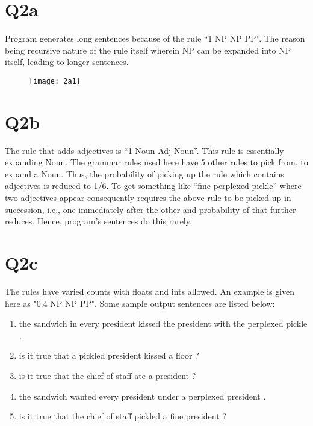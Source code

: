 \documentclass[12pt]{article}
\begin{document}
\section*{Q2a}
Program generates long sentences because of the rule “1\hspace{1cm} NP\hspace{1cm} NP PP”. The reason being recursive nature of the rule itself wherein NP can be expanded into NP itself, leading to longer sentences.
\begin{figure}[h]
\texttt{[image: 2a1]}
\centering
\end{figure}
\pagebreak
\section*{Q2b}
The rule that adds adjectives is “1\hspace{1cm} Noun\hspace{1cm} Adj Noun”.  This rule is essentially expanding Noun. The grammar rules used here have 5 other rules to pick from, to expand a Noun. Thus, the probability of picking up the rule which contains adjectives is reduced to 1/6. To get something like “fine perplexed pickle” where two adjectives appear consequently requires the above rule to be picked up in succession, i.e., one immediately after the other and probability of that further reduces. Hence, program’s sentences do this rarely.
\pagebreak
\section*{Q2c}
The rules have varied counts with floats and ints allowed. An example is given here as "0.4\hspace{1cm}	NP\hspace{1cm}	NP PP". Some sample output sentences are listed below:
\begin{enumerate}
		\item the  sandwich  in  every  president  kissed  the  president  with  the  perplexed  pickle  .
		\item is  it  true  that  a  pickled  president  kissed  a  floor  ? 
		\item is  it  true  that  the  chief  of  staff  ate  a  president  ?
		\item the  sandwich  wanted  every  president  under  a  perplexed  president  .
		\item is  it  true  that  the  chief  of  staff  pickled  a  fine  president  ? 
\end{enumerate}
\pagebreak
\end{document}
